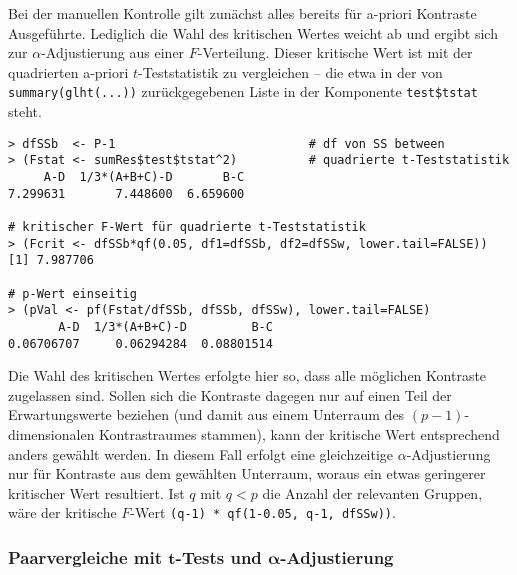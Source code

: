 Bei der manuellen Kontrolle gilt zunächst alles bereits für a-priori Kontraste Ausgeführte. Lediglich die Wahl des kritischen Wertes weicht ab und ergibt sich zur $\alpha$-Adjustierung aus einer $F$-Verteilung. Dieser kritische Wert ist mit der quadrierten a-priori $t$-Teststatistik zu vergleichen -- die etwa in der von \lstinline!summary(glht(...))! zurückgegebenen Liste in der Komponente \lstinline!test$tstat! steht.
\begin{lstlisting}
> dfSSb  <- P-1                           # df von SS between
> (Fstat <- sumRes$test$tstat^2)          # quadrierte t-Teststatistik
     A-D  1/3*(A+B+C)-D       B-C
7.299631       7.448600  6.659600

# kritischer F-Wert für quadrierte t-Teststatistik
> (Fcrit <- dfSSb*qf(0.05, df1=dfSSb, df2=dfSSw, lower.tail=FALSE))
[1] 7.987706

# p-Wert einseitig
> (pVal <- pf(Fstat/dfSSb, dfSSb, dfSSw), lower.tail=FALSE)
       A-D  1/3*(A+B+C)-D         B-C
0.06706707     0.06294284  0.08801514
\end{lstlisting}

Die Wahl des kritischen Wertes erfolgte hier so, dass alle möglichen Kontraste zugelassen sind. Sollen sich die Kontraste dagegen nur auf einen Teil der Erwartungswerte beziehen (und damit aus einem Unterraum des $(p-1)$-dimensionalen Kontrastraumes stammen), kann der kritische Wert entsprechend anders gewählt werden. In diesem Fall erfolgt eine gleichzeitige $\alpha$-Adjustierung nur für Kontraste aus dem gewählten Unterraum, woraus ein etwas geringerer kritischer Wert resultiert. Ist $q$ mit $q < p$ die Anzahl der relevanten Gruppen, wäre der kritische $F$-Wert \lstinline!(q-1) * qf(1-0.05, q-1, dfSSw))!.

\subsubsection[{Paarvergleiche mit \texorpdfstring{$t$}{t}-Tests und \texorpdfstring{$\alpha$}{alpha}-Adjustierung}]{Paarvergleiche mit $\bm{t}$-Tests und $\bm{\alpha}$-Adjustierung}
\label{sec:pairwiseT}

